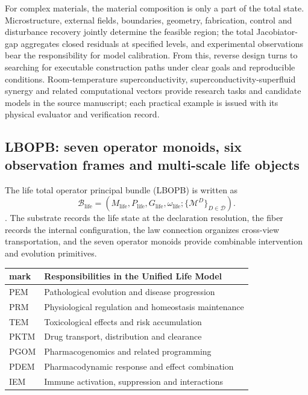 \documentclass[11pt,a4paper]{article}
\theoremstyle{plain}
\theoremstyle{definition}
\theoremstyle{remark}
\begin{document}
\begin{CJK*}
For complex materials, the material composition is only a part of the total state. Microstructure, external fields, boundaries, geometry, fabrication, control and disturbance recovery jointly determine the feasible region; the total Jacobiator-gap aggregates closed residuals at specified levels, and experimental observations bear the responsibility for model calibration. From this, reverse design turns to searching for executable construction paths under clear goals and reproducible conditions. Room-temperature superconductivity, superconductivity-superfluid synergy and related computational vectors provide research tasks and candidate models in the source manuscript; each practical example is issued with its physical evaluator and verification record.

\subsection { LBOPB: seven operator monoids, six observation frames and multi-scale life objects }

The life total operator principal bundle (LBOPB) is written as \[
 \mathcal B_{\mathrm{life}}=
 (M_{\mathrm{life}},P_{\mathrm{life}},G_{\mathrm{life}},
 \omega_{\mathrm{life}};\{\mathcal M^D\}_{D\in\mathcal D}).
\]. The substrate records the life state at the declaration resolution, the fiber records the internal configuration, the law connection organizes cross-view transportation, and the seven operator monoids provide combinable intervention and evolution primitives. \cite{S03}

\begin{center}
\begin{tabular}
{ll}\hline
mark&
Responsibilities in the Unified Life Model\\
\hline
PEM&
Pathological evolution and disease progression\\
PRM&
Physiological regulation and homeostasis maintenance\\
TEM&
Toxicological effects and risk accumulation\\
PKTM&
Drug transport, distribution and clearance\\
PGOM&
Pharmacogenomics and related programming\\
PDEM&
Pharmacodynamic response and effect combination\\
IEM&
Immune activation, suppression and interactions\\
\hline
\end{tabular}
\end{center}



\end{CJK*}
\end{document}
